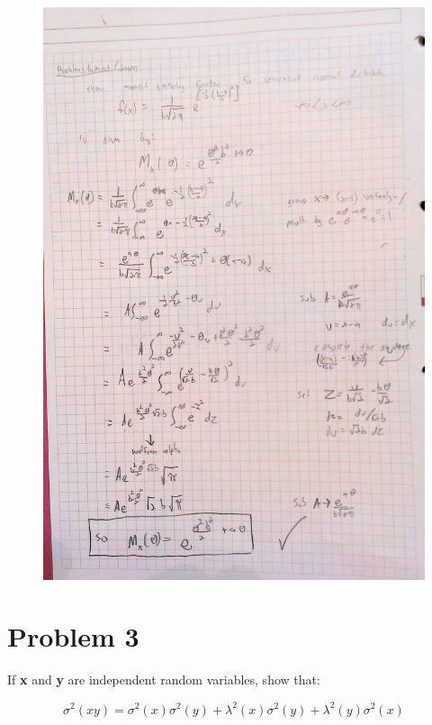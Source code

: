 \documentclass[]{article}
\begin{document}
\begin{figure}[hbtp]
	\noindent \includegraphics[scale=0.22]{Problem2.jpg}
\end{figure}




\vspace{3in}





\section{Problem 3}
If {\bf x} and {\bf y} are independent random variables, show that:

\begin{equation}
	\sigma^2(xy) = \sigma^2(x)\sigma^2(y) + \lambda^2(x)\sigma^2(y) +  \lambda^2(y)\sigma^2(x)
\end{equation} 
\end{document}
